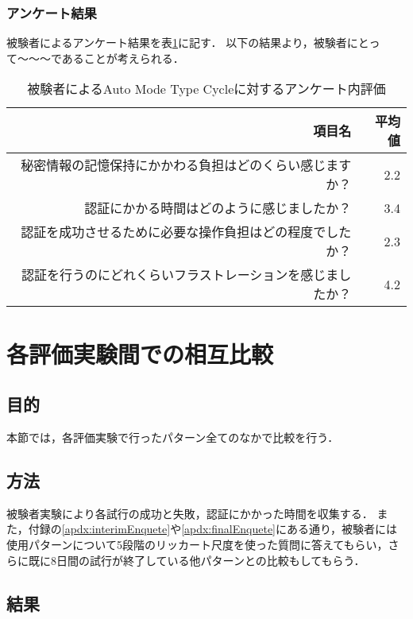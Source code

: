 \subsubsection{アンケート結果}
被験者によるアンケート結果を表\ref{tab:auto_cycle.enquete}に記す．
以下の結果より，被験者にとって〜〜〜であることが考えられる．
\begin{table}[ht]
  \begin{center}
    \small
    \begin{tabular}{|r|r|} \hline
      項目名 & 平均値 \\ \hline
      秘密情報の記憶保持にかかわる負担はどのくらい感じますか？ & 2.2 \\
      認証にかかる時間はどのように感じましたか？ & 3.4 \\
      認証を成功させるために必要な操作負担はどの程度でしたか？ & 2.3 \\
      認証を行うのにどれくらいフラストレーションを感じましたか？ & 4.2 \\ \hline
    \end{tabular}
  \end{center}
  \caption{被験者によるAuto Mode Type Cycleに対するアンケート内評価}
  \label{tab:auto_cycle.enquete}
\end{table}

\section{各評価実験間での相互比較}\label{sec:vsAll}
\subsection{目的}
本節では，各評価実験で行ったパターン全てのなかで比較を行う．

\subsection{方法}
被験者実験により各試行の成功と失敗，認証にかかった時間を収集する．
また，付録の\ref{apdx:interimEnquete}や\ref{apdx:finalEnquete}にある通り，被験者には使用パターンについて5段階のリッカート尺度を使った質問に答えてもらい，さらに既に8日間の試行が終了している他パターンとの比較もしてもらう．

\subsection{結果}
